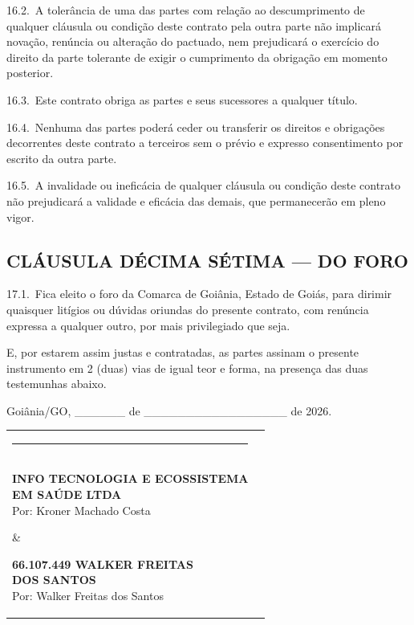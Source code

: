 \documentclass[11pt, a4paper]{article}
\begin{document}
16.2.\ A tolerância de uma das partes com relação ao descumprimento de qualquer cláusula ou condição deste contrato pela outra parte não implicará novação, renúncia ou alteração do pactuado, nem prejudicará o exercício do direito da parte tolerante de exigir o cumprimento da obrigação em momento posterior.

16.3.\ Este contrato obriga as partes e seus sucessores a qualquer título.

16.4.\ Nenhuma das partes poderá ceder ou transferir os direitos e obrigações decorrentes deste contrato a terceiros sem o prévio e expresso consentimento por escrito da outra parte.

16.5.\ A invalidade ou ineficácia de qualquer cláusula ou condição deste contrato não prejudicará a validade e eficácia das demais, que permanecerão em pleno vigor.

\pagebreak
\subsection{CLÁUSULA DÉCIMA SÉTIMA — DO FORO}

17.1.\ Fica eleito o foro da Comarca de Goiânia, Estado de Goiás, para dirimir quaisquer litígios ou dúvidas oriundas do presente contrato, com renúncia expressa a qualquer outro, por mais privilegiado que seja.

\vspace{1cm}

E, por estarem assim justas e contratadas, as partes assinam o presente instrumento em 2 (duas) vias de igual teor e forma, na presença das duas testemunhas abaixo.

\vspace{0.4cm}

\begin{center}
    Goiânia/GO, \_\_\_\_\_\_ de \_\_\_\_\_\_\_\_\_\_\_\_\_\_\_\_\_ de 2026.
\end{center}

\vspace{5.5cm}

\begin{center}
\begin{tabular}{p{} p{}}
    \centering\rule{7cm}{0.5pt} & \centering\rule{7cm}{0.5pt}\tabularnewline
    \centering\parbox[t]{7cm}{\centering\textbf{INFO TECNOLOGIA E ECOSSISTEMA\\[-2pt] EM SAÚDE LTDA}\\[2pt] \small Por: Kroner Machado Costa} &
    \centering\parbox[t]{7cm}{\centering\textbf{66.107.449 WALKER FREITAS\\[-2pt] DOS SANTOS}\\[2pt] \small Por: Walker Freitas dos Santos}\tabularnewline
\end{tabular}
\end{center}
\end{document}
